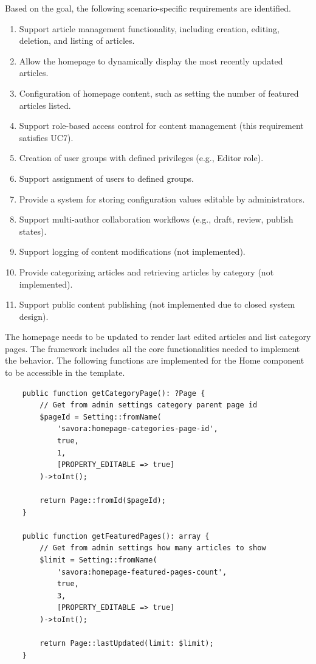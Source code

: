 Based on the goal, the following scenario-specific requirements are identified.

\begin{enumerate}
    \item Support article management functionality, including creation, editing, deletion, and listing of articles.
    \item Allow the homepage to dynamically display the most recently updated articles.
    \item Configuration of homepage content, such as setting the number of featured articles listed.
    \item Support role-based access control for content management (this requirement satisfies UC7).
    \item Creation of user groups with defined privileges (e.g., Editor role).
    \item Support assignment of users to defined groups.
    \item Provide a system for storing configuration values editable by administrators.
    \item Support multi-author collaboration workflows (e.g., draft, review, publish states).
    \item Support logging of content modifications (not implemented).
    \item Provide categorizing articles and retrieving articles by category (not implemented).
    \item Support public content publishing (not implemented due to closed system design).
\end{enumerate}

The homepage needs to be updated to render last edited articles and list category pages.
The framework includes all the core functionalities needed to implement the behavior.
The following functions are implemented for the Home component to be accessible in the template.

\begin{verbatim}
    public function getCategoryPage(): ?Page {
        // Get from admin settings category parent page id
        $pageId = Setting::fromName(
            'savora:homepage-categories-page-id',
            true,
            1,
            [PROPERTY_EDITABLE => true]
        )->toInt();

        return Page::fromId($pageId);
    }

    public function getFeaturedPages(): array {
        // Get from admin settings how many articles to show
        $limit = Setting::fromName(
            'savora:homepage-featured-pages-count',
            true,
            3,
            [PROPERTY_EDITABLE => true]
        )->toInt();

        return Page::lastUpdated(limit: $limit);
    }
\end{verbatim}

